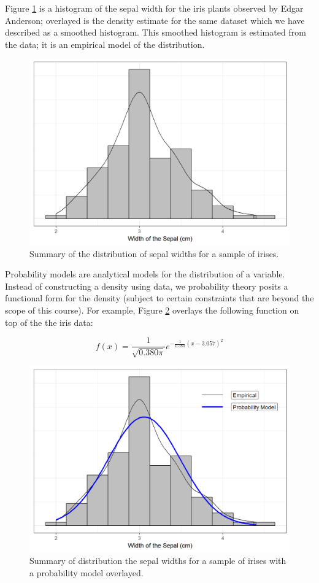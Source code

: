 \documentclass[]{book}
\theoremstyle{definition}
\theoremstyle{definition}
\theoremstyle{remark}
\begin{document}
Figure \ref{fig:anovaclassical-iris-histogram} is a histogram of the
sepal width for the iris plants observed by Edgar Anderson; overlayed is
the density estimate for the same dataset which we have described as a
smoothed histogram. This smoothed histogram is estimated from the data;
it is an empirical model of the distribution.

\begin{figure}

{\centering \includegraphics[width=0.8\linewidth]{./Images/anovaclassical-iris-histogram-1} 

}

\caption{Summary of the distribution of sepal widths for a sample of irises.}\label{fig:anovaclassical-iris-histogram}
\end{figure}

Probability models are analytical models for the distribution of a
variable. Instead of constructing a density using data, we probability
theory posits a functional form for the density (subject to certain
constraints that are beyond the scope of this course). For example,
Figure \ref{fig:anovaclassical-iris-normal} overlays the following
function on top of the the iris data:

\[f(x) = \frac{1}{\sqrt{0.380\pi}} e^{-\frac{1}{0.380}(x - 3.057)^2}\]

\begin{figure}

{\centering \includegraphics[width=0.8\linewidth]{./Images/anovaclassical-iris-normal-1} 

}

\caption{Summary of distribution  the sepal widths for a sample of irises with a probability model overlayed.}\label{fig:anovaclassical-iris-normal}
\end{figure}
\end{document}
